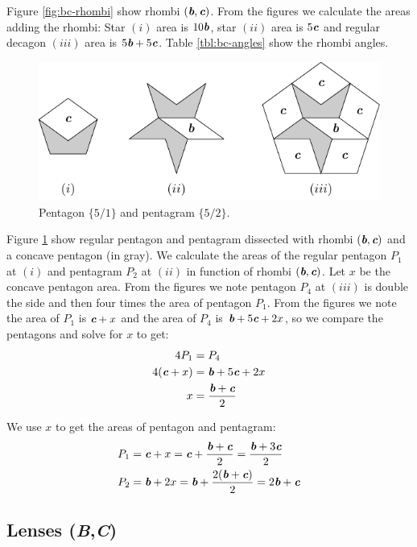 \documentclass[11pt]{article}
\def\mathbi#1{\textbf{\em #1}}
\begin{document}
Figure \ref{fig:bc-rhombi} show rhombi $(\mathbi{b},\mathbi{c})$. 
From the figures we calculate the areas adding the rhombi:
Star $(i)$ area is $10\mathbi{b}$, star $(ii)$ area is $5\mathbi{c}$ and 
regular decagon $(iii)$ area is $5\mathbi{b} + 5\mathbi{c}$. Table \ref {tbl:bc-angles} show the rhombi angles.

\begin{figure}[H]
\centering
\includegraphics[scale=1.1]{bc/penta}
\caption{Pentagon $\{5/1\}$ and pentagram $\{5/2\}$.}
\label{fig:bc-penta}
\end{figure}

Figure \ref{fig:bc-penta} show regular pentagon and pentagram dissected with rhombi $(\mathbi{b},\mathbi{c})$ and a concave pentagon (in gray). We calculate the areas of the regular pentagon $P_1$ at $(i)$ and pentagram $P_2$ at $(ii)$ in function of rhombi $(\mathbi{b},\mathbi{c})$. Let $x$ be the concave pentagon area. From the figures we note pentagon $P_4$ at $(iii)$ is double the side and then four times the area of pentagon $P_1$. From the figures we note the area of $P_1$ is $ \mathbi{c} + x$ and the area of $P_4$ is $\mathbi{b} + 5\mathbi{c} + 2x$, so we compare the pentagons and solve for $x$ to get:
\begin{align}
4P_1 &= P_4 \nonumber\\
4(\mathbi{c} + x) &= \mathbi{b} + 5\mathbi{c} + 2x\nonumber\\
x &= \frac{\mathbi{b} + \mathbi{c}}2
\end{align}

We use $x$ to get the areas of pentagon and pentagram:
\begin{align}
P_1 &= \mathbi{c} + x
 =  \mathbi{c} + \frac{\mathbi{b} + \mathbi{c}}2
 = \frac{\mathbi{b} + 3\mathbi{c}}2 \\
P_2 &= \mathbi{b} + 2x
 =  \mathbi{b} + \frac{2(\mathbi{b} + \mathbi{c})}2
 = 2\mathbi{b} + \mathbi{c}
\end{align}

\subsection{Lenses (\mathbi{B},\mathbi{C})}
\end{document}

